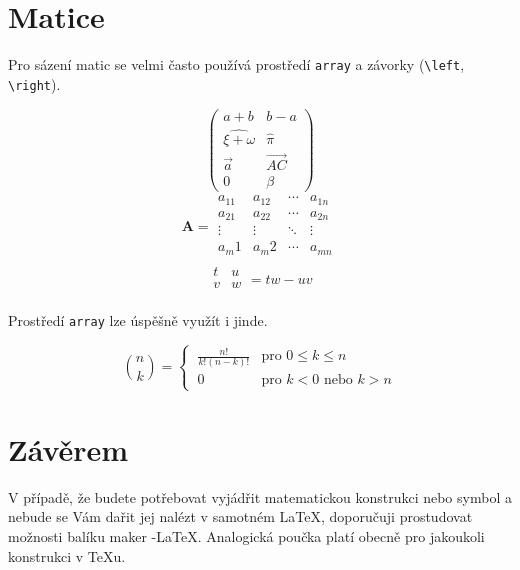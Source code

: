 \documentclass[11pt,twocolumn,a4paper]{article}
\theoremstyle{definition}
\begin{document}
\section{Matice}

Pro sázení matic se velmi často používá prostředí \texttt{array} a závorky (\verb|\left|, \verb|\right|). 

$$ \left( \begin{array}{cc}
a+b & b-a \\
\widehat{\xi + \omega} & \widehat{\pi} \\
\overrightarrow{a} & \overrightarrow{AC} \\
0 & \beta
\end{array}
\right) $$
$$\textbf{A} =
\begin{array}{||cccc||}
a_11 & a_12 & \cdots & a_{1n} \\
a_21 & a_22 & \cdots & a_{2n} \\
\vdots & \vdots & \ddots & \vdots \\
a_m1 & a_m2 & \cdots & a_{mn} \\
\end{array}$$
$$\begin{array}{|cc|}
t & u \\
v & w \\
\end{array} = tw - uv $$

Prostředí \texttt{array} lze úspěšně využít i jinde.

$$ \binom{n}{k} = \begin{cases}
\ \frac{n!}{k!(n-k)!} & \text{pro } 0 \leq k \leq n \\
\ 0 & \text{pro } k < 0 \text{ nebo } k > n \end{cases}$$

\section{Závěrem}

V případě, že budete potřebovat vyjádřit matematickou konstrukci nebo symbol a nebude se Vám dařit jej nalézt v samotném \LaTeX, doporučuji prostudovat možnosti balíku maker \AmS-\LaTeX.
Analogická poučka platí obecně pro jakoukoli konstrukci v \TeX u.
\end{document}
